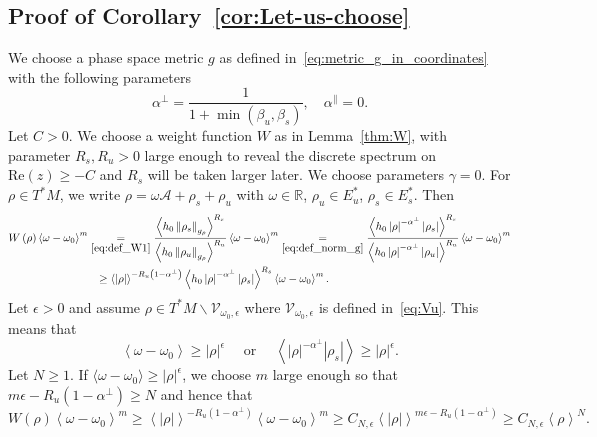 \documentclass[10pt]{amsart}
\theoremstyle{definition}\newtheorem{defi}[theo]{Definition}\newtheorem{rema}[theo]{Remark}\newtheorem{exam}[theo]{Example}\newtheorem{exem}[theo]{Example}\newtheorem{nota}[theo]{Notation}
\newcommand{\clV}{\mathcal{V}}
\newcommand{\Ree}{\mathrm{Re}}
\newcommand{\bbR}{\mathbb{R}}
\newcommand{\scrA}{\mathscr{A}}
\begin{document}
\subsection{\label{subsec:Proof-of-Corollary}
Proof of Corollary~\ref{cor:Let-us-choose}}

We choose a phase space metric $g$ as defined in~\eqref{eq:metric_g_in_coordinates} with the following parameters
\[
\alpha^{\perp}=\frac{1}{1+\min\left(\beta_{u},\beta_{s}\right)},\quad\alpha^{\parallel}=0.
\]
Let $C>0$. We choose a weight function $W$ as in Lemma~\ref{thm:W}, with parameter $R_{s},R_{u}>0$ large enough to reveal the discrete spectrum on $\Ree(z)\geq-C$ and $R_{s}$ will be taken larger later. We choose parameters $\gamma=0$. For $\rho\in T^{*}M$, we write $\rho=\omega\scrA+\rho_{s}+\rho_{u}$ with $\omega\in\bbR$, $\rho_{u}\in E_{u}^{*}$, $\rho_{s}\in E_{s}^{*}$. Then
\begin{align*}
W\left(\rho\right)\left\langle \omega-\omega_{0}\right\rangle ^{m} & \underset{\eqref{eq:def_W1}}{=}\frac{\left\langle h_{0}\left\Vert \rho_{s}\right\Vert _{g_{\rho}}\right\rangle ^{R_{s}}}{\left\langle h_{0}\left\Vert \rho_{u}\right\Vert _{g_{\rho}}\right\rangle ^{R_{u}}}\left\langle \omega-\omega_{0}\right\rangle ^{m}\underset{\eqref{eq:def_norm_g}}{=}\frac{\left\langle h_{0}\left|\rho\right|^{-\alpha^{\perp}}\left|\rho_{s}\right|\right\rangle ^{R_{s}}}{\left\langle h_{0}\left|\rho\right|^{-\alpha^{\perp}}\left|\rho_{u}\right|\right\rangle ^{R_{u}}}\left\langle \omega-\omega_{0}\right\rangle ^{m}\\
& \mkern13mu\geq\left\langle \left|\rho\right|\right\rangle ^{-R_{u}\left(1-\alpha^{\perp}\right)}\left\langle h_{0}\left|\rho\right|^{-\alpha^{\perp}}\left|\rho_{s}\right|\right\rangle ^{R_{s}}\left\langle \omega-\omega_{0}\right\rangle ^{m}.
\end{align*}
Let $\epsilon>0$ and assume $\rho\in T^{*}M\backslash\clV_{\omega_{0},\epsilon}$ where $\clV_{\omega_{0},\epsilon}$ is defined in~\eqref{eq:Vu}. This means that
\[
\left\langle \omega-\omega_{0}\right\rangle \geq\left|\rho\right|^{\epsilon}\quad\text{ or }\quad\left\langle \left|\rho\right|^{-\alpha^{\perp}}\left|\rho_{s}\right|\right\rangle \geq\left|\rho\right|^{\epsilon}.
\]
Let $N\geq1$. If $\langle \omega-\omega_{0}\rangle \geq|\rho|^{\epsilon}$, we choose $m$ large enough so that $m\epsilon-R_{u}(1-\alpha^{\perp})\geq N$ and hence that
\[
W\left(\rho\right)\left\langle \omega-\omega_{0}\right\rangle ^{m}\geq\left\langle \left|\rho\right|\right\rangle ^{-R_{u}\left(1-\alpha^{\perp}\right)}\left\langle \omega-\omega_{0}\right\rangle ^{m}\geq C_{N,\epsilon}\left\langle \left|\rho\right|\right\rangle ^{m\epsilon-R_{u}\left(1-\alpha^{\perp}\right)}\geq C_{N,\epsilon}\left\langle \rho\right\rangle ^{N}.
\]
\end{document}
